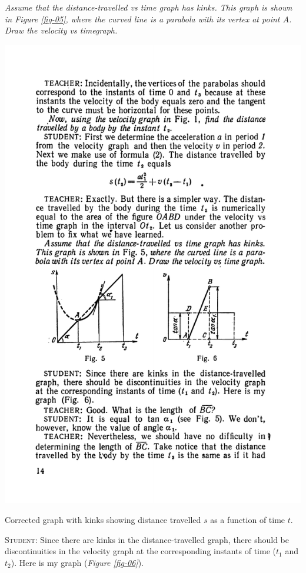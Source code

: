 \documentclass[a4paper,sfsidenotes]{tufte-book}
\begin{document}
\textit{Assume that the distance-travelled \emph{vs} time graph has kinks. This graph is shown in \emph{Figure \ref{fig-05}}, where the curved line is a parabola with its vertex at point $A$. Draw the velocity \emph{vs} timegraph.}
\begin{marginfigure}
\centering
\includegraphics[width=1.1\linewidth]{fig-005a.pdf}
\caption{Corrected graph with kinks showing distance travelled $s$ as a function of time $t$.}
\label{fig-05}
\end{marginfigure}

\textsc{Student:} Since there are kinks in the distance-travelled graph, there should be discontinuities in the velocity graph at the corresponding instants of time ($t_{1}$ and $t_{2}$). Here is my graph (\emph{Figure \ref{fig-06}}).\\
\end{document}
